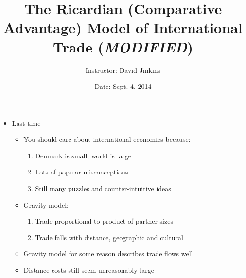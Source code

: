 \documentclass[ignorenonframetext,]{beamer}
\title{The Ricardian (Comparative Advantage) Model of International Trade (\emph{MODIFIED})}
\author{Instructor: David Jinkins}
\date{Date: Sept. 4, 2014}
\begin{document}
\frame{\titlepage}

\begin{frame}
\begin{itemize}
\itemsep1pt\parskip0pt
\item
  Last time 

  \begin{itemize}
  \itemsep1pt\parskip0pt
  \item You should care about international economics because:
      \begin{enumerate}
          \item Denmark is small, world is large
          \item Lots of popular misconceptions
          \item Still many puzzles and counter-intuitive ideas
      \end{enumerate}
  \item Gravity model:
      \begin{enumerate}
          \item Trade proportional to product of partner sizes 
          \item Trade falls with distance, geographic and cultural 
      \end{enumerate}
  \item Gravity model for some reason describes trade flows well
  \item Distance costs still seem unreasonably large 
  \end{itemize}
\end{itemize}

\end{frame}

\begin{frame}

\end{frame}
\end{document}
